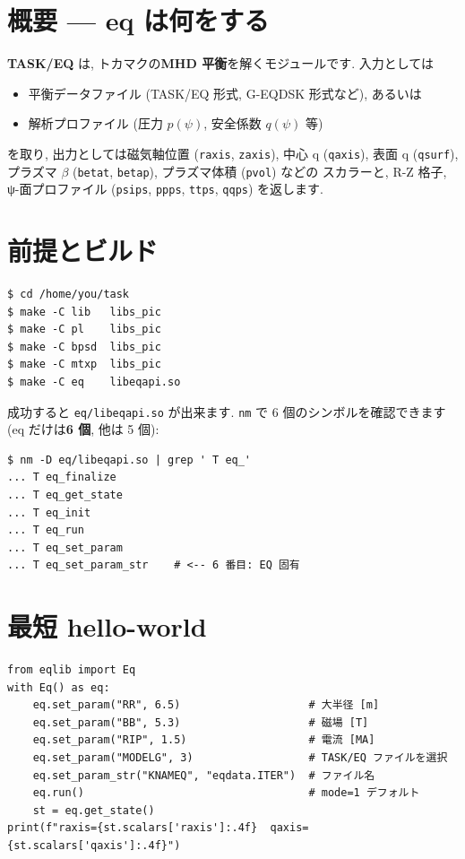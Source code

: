 \documentclass[11pt,a4paper]{report}
\begin{document}
\section{概要 — eq は何をする}

\textbf{TASK/EQ} は, トカマクの\textbf{MHD 平衡}を解くモジュールです.
入力としては
\begin{itemize}[leftmargin=1.5em]
  \item 平衡データファイル (TASK/EQ 形式, G-EQDSK 形式など), あるいは
  \item 解析プロファイル (圧力 \(p(\psi)\), 安全係数 \(q(\psi)\) 等)
\end{itemize}
を取り, 出力としては磁気軸位置 (\texttt{raxis}, \texttt{zaxis}),
中心 q (\texttt{qaxis}), 表面 q (\texttt{qsurf}), プラズマ \(\beta\)
(\texttt{betat}, \texttt{betap}), プラズマ体積 (\texttt{pvol}) などの
スカラーと, R-Z 格子, ψ-面プロファイル (\texttt{psips},
\texttt{ppps}, \texttt{ttps}, \texttt{qqps}) を返します.

\section{前提とビルド}

\begin{lstlisting}[style=bash,caption={eq モジュールのライブラリビルド}]
$ cd /home/you/task
$ make -C lib   libs_pic
$ make -C pl    libs_pic
$ make -C bpsd  libs_pic
$ make -C mtxp  libs_pic
$ make -C eq    libeqapi.so
\end{lstlisting}

成功すると \texttt{eq/libeqapi.so} が出来ます. \texttt{nm} で
6 個のシンボルを確認できます (eq だけは\textbf{6 個}, 他は 5 個):

\begin{lstlisting}[style=bash]
$ nm -D eq/libeqapi.so | grep ' T eq_'
... T eq_finalize
... T eq_get_state
... T eq_init
... T eq_run
... T eq_set_param
... T eq_set_param_str    # <-- 6 番目: EQ 固有
\end{lstlisting}

\section{最短 hello-world}

\begin{lstlisting}[style=py,caption={\texttt{eqlib} 最小例 — 平衡ファイル (TASK/EQ 形式) 読込}]
from eqlib import Eq
with Eq() as eq:
    eq.set_param("RR", 6.5)                    # 大半径 [m]
    eq.set_param("BB", 5.3)                    # 磁場 [T]
    eq.set_param("RIP", 1.5)                   # 電流 [MA]
    eq.set_param("MODELG", 3)                  # TASK/EQ ファイルを選択
    eq.set_param_str("KNAMEQ", "eqdata.ITER")  # ファイル名
    eq.run()                                   # mode=1 デフォルト
    st = eq.get_state()
print(f"raxis={st.scalars['raxis']:.4f}  qaxis={st.scalars['qaxis']:.4f}")
\end{lstlisting}
\end{document}
